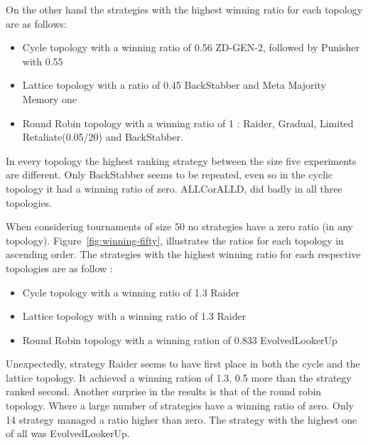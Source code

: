 On the other hand the strategies with the highest winning ratio for each
topology are as follows:

\begin{itemize}
  \item Cycle topology with a winning ratio of 0.56 ZD-GEN-2, followed by Punisher
        with 0.55
  \item Lattice topology with a ratio of 0.45 BackStabber and Meta Majority
        Memory one
  \item Round Robin topology with a winning ratio of 1 : Raider, Gradual, Limited
        Retaliate(0.05/20) and BackStabber.
\end{itemize}

In every topology the highest ranking strategy between the size five experiments
are different. Only BackStabber seems to be repeated, even so in the cyclic topology
 it had a winning ratio of zero. ALLCorALLD, did badly in all
three topologies.

When considering tournaments of size 50
no strategies have a zero ratio (in any topology).
Figure~\ref{fig:winning-fifty}, illustrates the ratios
for each topology in ascending order. The strategies with the highest winning ratio
for each respective topologies are as follow :

\begin{itemize}
  \item Cycle topology with a winning ratio of 1.3 Raider
  \item Lattice topology with a winning ratio of 1.3 Raider
  \item Round Robin topology with a winning ration of 0.833 EvolvedLookerUp
\end{itemize}

Unexpectedly, strategy Raider seems to have first place in both
the cycle and the lattice topology. It achieved a winning ration of 1.3, 0.5
more than the strategy ranked second. Another surprise in the results is
that of the round robin topology. Where a large number of strategies have a
winning ratio
of zero. Only 14 strategy managed a ratio higher than zero. The strategy with
the highest one of all was EvolvedLookerUp.

